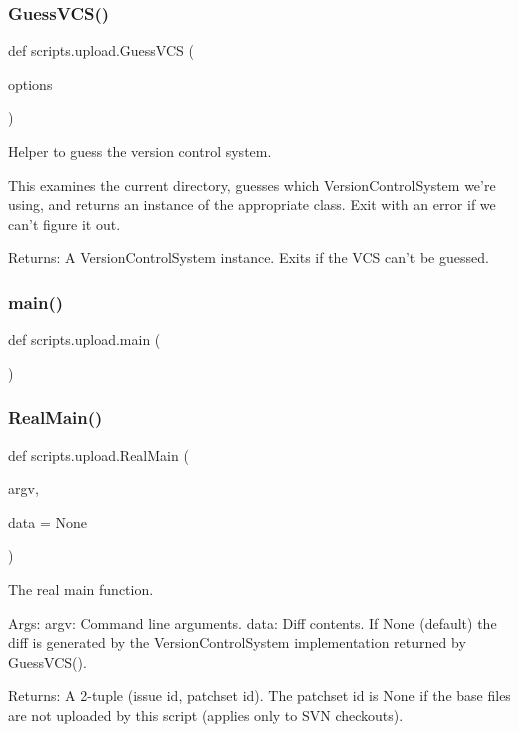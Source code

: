 \subsubsection{\texorpdfstring{GuessVCS()}{GuessVCS()}}
{\footnotesize\ttfamily def scripts.\+upload.\+Guess\+V\+CS (\begin{DoxyParamCaption}\item[{}]{options }\end{DoxyParamCaption})}

\begin{DoxyVerb}Helper to guess the version control system.

This examines the current directory, guesses which VersionControlSystem
we're using, and returns an instance of the appropriate class.  Exit with an
error if we can't figure it out.

Returns:
  A VersionControlSystem instance. Exits if the VCS can't be guessed.
\end{DoxyVerb}
 \mbox{\label{namespacescripts_1_1upload_a1e4126dfe42af810dcb9da4cbea20a63}} 
\subsubsection{\texorpdfstring{main()}{main()}}
{\footnotesize\ttfamily def scripts.\+upload.\+main (\begin{DoxyParamCaption}{ }\end{DoxyParamCaption})}

\mbox{\label{namespacescripts_1_1upload_a8ed33352d6363488beaf1041faea3fcb}} 
\subsubsection{\texorpdfstring{RealMain()}{RealMain()}}
{\footnotesize\ttfamily def scripts.\+upload.\+Real\+Main (\begin{DoxyParamCaption}\item[{}]{argv,  }\item[{}]{data = {\ttfamily None} }\end{DoxyParamCaption})}

\begin{DoxyVerb}The real main function.

Args:
  argv: Command line arguments.
  data: Diff contents. If None (default) the diff is generated by
    the VersionControlSystem implementation returned by GuessVCS().

Returns:
  A 2-tuple (issue id, patchset id).
  The patchset id is None if the base files are not uploaded by this
  script (applies only to SVN checkouts).
\end{DoxyVerb}
 \mbox{\label{namespacescripts_1_1upload_aedb3f0fa371c86c473a04cb68be4e621}} 
